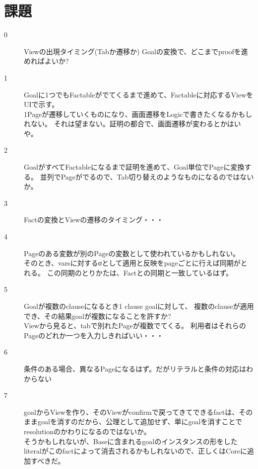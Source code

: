 \documentclass[10pt, onecolumn]{jarticle}   	%
\begin{document}
\newpage
\section{課題}
\begin{description}
\item[0]Viewの出現タイミング(Tabか遷移か)
Goalの変換で、どこまでproofを進めればよいか?
\item[1]Goalに1つでもFactableがでてくるまで進めて、Factableに対応するViewをUIで示す。\\
1Pageが遷移していくものになり、画面遷移をLogicで書きたくなるかもしれない。
それは望まない。証明の都合で、画面遷移が変わるとかはいや。
\item[2]GoalがすべてFactableになるまで証明を進めて、Goal単位でPageに変換する。
並列でPageがでるので、Tab切り替えのようなものになるのではないか。
\item[3]Factの変換とViewの遷移のタイミング・・・
\item[4]Pageのある変数が別のPageの変数として使われているかもしれない。\\
そのとき、varsに対するσとして適用と反映をpageごとに行えば同期がとれる。
この同期のとりかたは、Factとの同期と一致しているはず。
\item[5]Goalが複数のclauseになるとき1 clause goalに対して、
複数のclauseが適用でき、その結果goalが複数になることを許すか?\\
Viewから見ると、tabで別れたPageが複数でてくる。
利用者はそれらのPageのどれか一つを入力しきればいい・・・
\item[6]条件のある場合、異なるPageになるはず。だがリテラルと条件の対応はわからない
\item[7] goalからViewを作り、そのViewがconfirmで戻ってきてできるfactは、そのままgoalを消すのだから、公理として追加せず、単にgoalを消すことでresolutionのかわりになるのではないか。\\
そうかもしれないが、Baseに含まれるgoalのインスタンスの形をしたliteralがこのfactによって消去されるかもしれないので、正しくはCoreに追加すべきだ。

\end{description}
\end{document}
